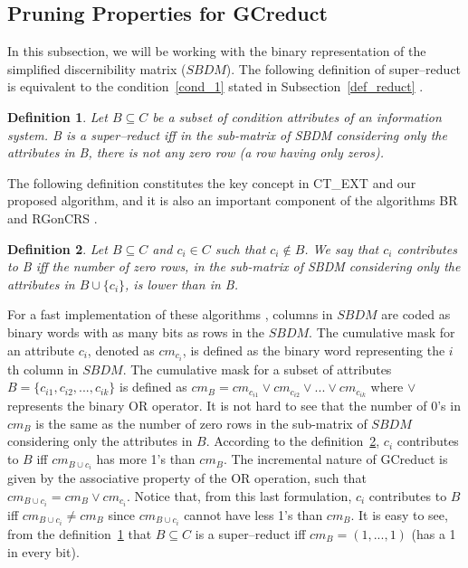 \documentclass[authoryear,preprint,review,12pt]{elsarticle}
\newtheorem{definition}{Definition}
\begin{document}
  
\subsection{Pruning Properties for GCreduct}\label{properties}
	In this subsection, we will be working with the binary representation of the simplified discernibility matrix
	($SBDM$). The following definition of super--reduct is equivalent to the condition~\ref{cond_1} stated in 
	Subsection~\ref{def_reduct} \citep{Lazo15}.
	
	\begin{definition}\label{def:testor}
		Let $B \subseteq C$ be a subset of condition attributes of an information system. B is a super--reduct 
		iff in the sub-matrix of SBDM considering only the attributes in B, there is not any zero row (a row 
		having only zeros).
	\end{definition}
	
	The following definition constitutes the key concept in CT\_EXT \citep{Sanchez07} and our proposed algorithm,
	and it is also an important component of the algorithms BR \citep{Lias09} and RGonCRS
	\citep{WangP07}.
		
	\begin{definition}\label{def:contrib}
		Let $B \subseteq C$ and  $c_i \in C$ such that $c_i \notin B$. We say that $c_i$ contributes to B iff the
		number of zero rows, in the sub-matrix of SBDM considering only the attributes in 
		$B\cup\{c_i\}$, is lower than in B.
	\end{definition}		
		
	For a fast implementation of these algorithms \citep{Sanchez10,Lias13}, columns in $SBDM$ are coded as binary
	words with as many bits as rows in the $SBDM$. The cumulative mask for an attribute $c_i$, denoted as $cm_{c_i}$, is defined as the binary word representing the $i$th column in $SBDM$. The cumulative mask for a subset of attributes $B=\lbrace c_{i1},c_{i2},...,c_{ik} \rbrace$ is defined	as $cm_B = cm_{c_{i1}} \vee cm_{c_{i2}} \vee ... \vee cm_{c_{ik}}$ where $\vee$ represents the binary OR operator. It is not hard to see that the number of 0's in $cm_B$ is the same as the number of zero rows in the sub-matrix of $SBDM$ considering only the attributes in $B$. 
	According to the definition~\ref{def:contrib}, $c_i$ contributes to $B$ iff $cm_{B\cup c_i}$ has more 1's than 
	$cm_B$. The incremental nature of GCreduct is given by the associative property of the OR operation, such that 
	$cm_{B\cup c_i}=cm_B\vee cm_{c_i}$. Notice that, from this last formulation, $c_i$ contributes to $B$ iff 
	$cm_{B\cup c_i}\neq cm_B$ since $cm_{B\cup c_i}$ cannot have less 1's than $cm_B$. It is easy to see, from the
	definition~\ref{def:testor} that $B \subseteq C$ is a super--reduct iff $cm_B=(1,...,1)$ (has a 1 in every bit).
\end{document}
